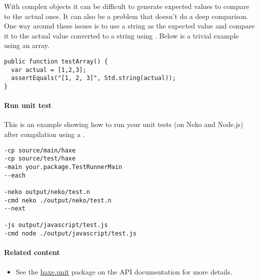 With complex objects it can be difficult to generate expected values to compare to the actual ones. It can also be a problem that  doesn't do a deep comparison. One way around these issues is to use a string as the expected value and compare it to the actual value converted to a string using . Below is a trivial example using an array.

\begin{lstlisting} 
public function testArray() {
  var actual = [1,2,3];
  assertEquals("[1, 2, 3]", Std.string(actual));
}
\end{lstlisting} 

\paragraph{Run unit test}

This is an example showing how to run your unit tests (on Neko and Node.js) after compilation using a .

\begin{lstlisting} 
-cp source/main/haxe
-cp source/test/haxe
-main your.package.TestRunnerMain
--each

-neko output/neko/test.n
-cmd neko ./output/neko/test.n
--next

-js output/javascript/test.js
-cmd node ./output/javascript/test.js
\end{lstlisting} 

\paragraph{Related content}
\begin{itemize}
	\item See the \href{https://api.haxe.org/haxe/unit/}{haxe.unit} package on the API documentation for more details.
\end{itemize}
